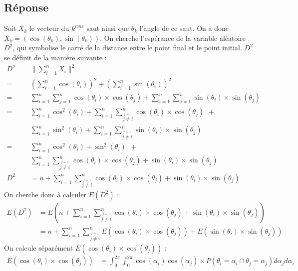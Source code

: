 \documentclass[10pt,a4paper,twoside]{article}
\begin{document}
\subsection*{Réponse}
Soit $X_{k}$ le vecteur du $k^{eme}$ saut ainsi que $\theta_{k}$ l'angle de ce saut. On a donc $X_{k} = (\cos(\theta_{k}),\sin(\theta_{k}))$. On cherche l'espérance de la variable aléatoire $D^{2}$, qui symbolise le carré de la distance entre le point final et le point initial. $D^{2}$ se définit de la manière suivante :
\begin{align*}
D^{2} =& \parallel \sum_{i=1}^{n} X_{i} \parallel^{2}\\
 =& \left(\sum_{i=1}^{n} \cos(\theta_{i}) \right)^{2} + \left(\sum_{i=1}^{n} \sin(\theta_{i}) \right)^{2}\\
 =&\sum_{i=1}^{n}\sum_{j=1}^{n} \cos(\theta_{i}) \times \cos(\theta_{j}) + \sum_{i=1}^{n}\sum_{j=1}^{n} \sin(\theta_{i}) \times \sin(\theta_{j})\\
 =& \sum_{i=1}^{n} \cos^{2}(\theta_{i}) + \sum_{i=1}^{n}\sum_{\overset{j=1}{j\neq i}}^{n} \cos(\theta_{i}) \times \cos(\theta_{j})\ \ +\\
 &\sum_{i=1}^{n} \sin^{2}(\theta_{i}) + \sum_{i=1}^{n}\sum_{\overset{j=1}{j\neq i}}^{n} \sin(\theta_{i}) \times \sin(\theta_{j})\\
  =& \sum_{i=1}^{n} \cos^{2}(\theta_{i})+\sin^{2}(\theta_{i})\ \ +\\
 & \sum_{i=1}^{n}\sum_{\overset{j=1}{j\neq i}}^{n} \cos(\theta_{i}) \times \cos(\theta_{j}) + \sin(\theta_{i}) \times \sin(\theta_{j})\\
D^{2} & = n + \sum_{i=1}^{n}\sum_{\overset{j=1}{j\neq i}}^{n} \cos(\theta_{i}) \times \cos(\theta_{j}) + \sin(\theta_{i}) \times \sin(\theta_{j})
\end{align*}
On cherche donc à calculer $E(D^{2})$ :
\begin{align*}
E(D^{2}) &= E\left(n + \sum_{i=1}^{n}\sum_{\overset{j=1}{j\neq i}}^{n} \cos(\theta_{i}) \times \cos(\theta_{j}) + \sin(\theta_{i}) \times \sin(\theta_{j})\right)\\
&= n + \sum_{i=1}^{n}\sum_{\overset{j=1}{j\neq i}}^{n} E(\cos(\theta_{i}) \times \cos(\theta_{j})) + E(\sin(\theta_{i}) \times \sin(\theta_{j}))
\end{align*}
On calcule séparément $E(\cos(\theta_{i}) \times \cos(\theta_{j}))$ :
\begin{align*}
E(\cos(\theta_{i}) \times \cos(\theta_{j})) &= \int_{0}^{2\pi}\int_{0}^{2\pi} \cos(\alpha_{i})\cos(\alpha_{j}) \times P(\theta_{i}=\alpha_{i} \cap \theta_{j}=\alpha_{j})d\alpha_{j}d\alpha_{i}
\end{align*}
\end{document}
